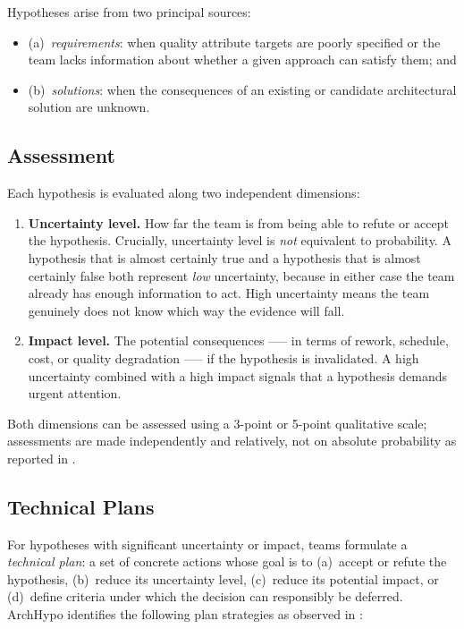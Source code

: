 Hypotheses arise from two principal sources:

\begin{itemize}
  \item (a)~\emph{requirements}: when quality attribute targets are poorly specified or the team lacks information about whether a given approach can satisfy them; and 
  \item (b)~\emph{solutions}: when the consequences of an existing or candidate architectural solution are unknown.
\end{itemize}

\subsection{Assessment}
\label{subsec:archhypo-assessment}

Each hypothesis is evaluated along two independent dimensions:

\begin{enumerate}
  \item \textbf{Uncertainty level.} How far the team is from being able to refute or
  accept the hypothesis. Crucially, uncertainty level is \emph{not} equivalent to
  probability. A hypothesis that is almost certainly true and a hypothesis that is almost
  certainly false both represent \emph{low} uncertainty, because in either case the team
  already has enough information to act. High uncertainty means the team genuinely
  does not know which way the evidence will fall.

  \item \textbf{Impact level.} The potential consequences --— in terms of rework,
  schedule, cost, or quality degradation --— if the hypothesis is invalidated. A high
  uncertainty combined with a high impact signals that a hypothesis demands urgent
  attention.
\end{enumerate}

Both dimensions can be assessed using a 3-point or 5-point qualitative scale;
assessments are made independently and relatively, not on absolute probability as reported in \citet{silva2024tse}.

\subsection{Technical Plans}
\label{subsec:archhypo-technical-plans}

For hypotheses with significant uncertainty or impact, teams formulate a
\emph{technical plan}: a set of concrete actions whose goal is to (a)~accept or refute
the hypothesis, (b)~reduce its uncertainty level, (c)~reduce its potential impact, or
(d)~define criteria under which the decision can responsibly be
deferred. ArchHypo identifies the following plan strategies as observed in \citet{silva2024ieeesw}:

